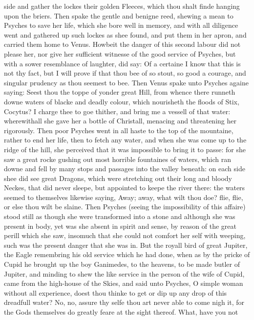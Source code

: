 side and gather the lockes their golden Fleeces, which thou shalt finde hanging
upon the briers. Then spake the gentle and benigne reed, shewing a mean to
Psyches to save her life, which she bore well in memory, and with all diligence
went and gathered up such lockes as shee found, and put them in her apron, and
carried them home to Venus. Howbeit the danger of this second labour did not
please her, nor give her sufficient witnesse of the good service of Psyches,
but with a sower resemblance of laughter, did say: Of a certaine I know that
this is not thy fact, but I will prove if that thou bee of so stout, so good a
courage, and singular prudency as thou seemest to bee. Then Venus spake unto
Psyches againe saying: Seest thou the toppe of yonder great Hill, from whence
there runneth downe waters of blacke and deadly colour, which nourisheth the
floods of Stix, Cocytus? I charge thee to goe thither, and bring me a vessell
of that water: wherewithall she gave her a bottle of Christall, menacing and
threatening her rigorously. Then poor Psyches went in all haste to the top of
the mountaine, rather to end her life, then to fetch any water, and when she
was come up to the ridge of the hill, she perceived that it was impossible to
bring it to passe: for she saw a great rocke gushing out most horrible
fountaines of waters, which ran downe and fell by many stops and passages into
the valley beneath: on each side shee did see great Dragons, which were
stretching out their long and bloody Neckes, that did never sleepe, but
appointed to keepe the river there: the waters seemed to themselves likewise
saying, Away; away, what wilt thou doe? flie, flie, or else thou wilt be
slaine. Then Psyches (seeing the impossibility of this affaire) stood still as
though she were transformed into a stone and although she was present in body,
yet was she absent in spirit and sense, by reason of the great perill which she
saw, insomuch that she could not comfort her self with weeping, such was the
present danger that she was in. But the royall bird of great Jupiter, the Eagle
remembring his old service which he had done, when as by the pricke of Cupid he
brought up the boy Ganimedes, to the heavens, to be made butler of Jupiter, and
minding to shew the like service in the person of the wife of Cupid, came from
the high-house of the Skies, and said unto Psyches, O simple woman without all
experience, doest thou thinke to get or dip up any drop of this dreadfull
water? No, no, assure thy selfe thou art never able to come nigh it, for the
Gods themselves do greatly feare at the sight thereof. What, have you not
